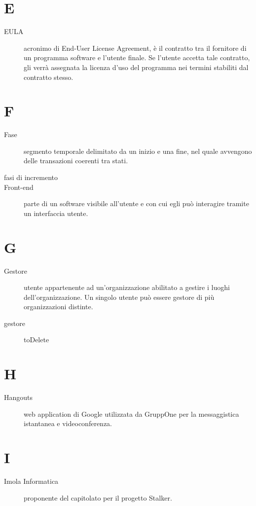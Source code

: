 \documentclass{article}
\begin{document}
	\section{E}
	\begin{description}
		\item[EULA] acronimo di End-User License Agreement, è il contratto tra il fornitore di un programma software e l'utente finale. Se l'utente accetta tale contratto, gli verrà assegnata la licenza d'uso del programma nei termini stabiliti dal contratto stesso.
	\end{description}
	\section{F}
	\begin{description}
		\item[Fase] segmento temporale delimitato da un inizio e una fine, nel quale avvengono delle transazioni coerenti tra stati.
		\item[fasi di incremento] 
		\item[Front-end] parte di un software visibile all'utente e con cui egli può interagire tramite un interfaccia utente.
	\end{description}
	\section{G}
	\begin{description}
		\item[Gestore] utente appartenente ad un'organizzazione abilitato a gestire i luoghi dell'organizzazione. Un singolo utente può essere gestore di più organizzazioni distinte.
		\item[gestore] toDelete
	\end{description}
	\section{H}
	\begin{description}
		\item[Hangouts] web application di Google utilizzata da GruppOne per la messaggistica istantanea e videoconferenza.
	\end{description}
	\section{I}
	\begin{description}
		\item[Imola Informatica] proponente del capitolato per il progetto Stalker.
	\end{description}
\end{document}

